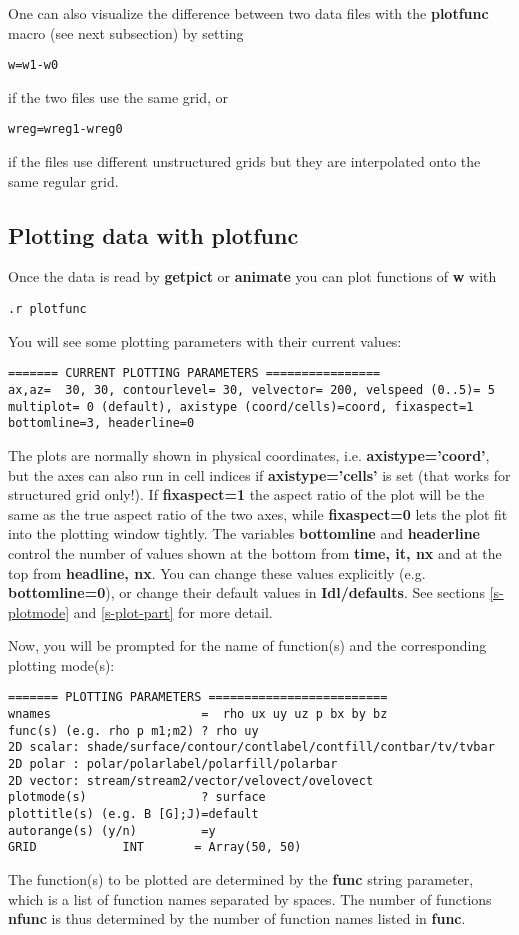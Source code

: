One can also visualize the difference between two data files 
with the {\bf plotfunc} macro (see next subsection) by setting
\begin{verbatim}
w=w1-w0
\end{verbatim}
   if the two files use the same grid, or
\begin{verbatim}
wreg=wreg1-wreg0
\end{verbatim}
if the files use different unstructured grids but they are 
interpolated onto the same regular grid.

\subsection{Plotting data with plotfunc \label{s-plotfunc}}

   Once the data is read by {\bf getpict} or {\bf animate} you can plot 
   functions of {\bf w} with
\begin{verbatim}
.r plotfunc
\end{verbatim}
   You will see some plotting parameters with their current values:
\begin{verbatim}
======= CURRENT PLOTTING PARAMETERS ================
ax,az=  30, 30, contourlevel= 30, velvector= 200, velspeed (0..5)= 5
multiplot= 0 (default), axistype (coord/cells)=coord, fixaspect=1
bottomline=3, headerline=0
\end{verbatim}
   The plots are normally shown in physical coordinates, i.e.
   {\bf axistype='coord'}, but the axes can also run in cell indices 
   if {\bf axistype='cells'} is set (that works for structured grid only!).
   If {\bf fixaspect=1} the aspect ratio of the plot will be the same
   as the true aspect ratio of the two axes, while {\bf fixaspect=0} lets
   the plot fit into the plotting window tightly.
   The variables {\bf bottomline} and {\bf headerline} control the number
   of values shown at the bottom from {\bf time, it, nx} and at the top 
   from {\bf headline, nx}.
   You can change these values explicitly (e.g. {\bf bottomline=0}), or change 
   their default values in {\bf Idl/defaults}. 
   See sections \ref{s-plotmode} and \ref{s-plot-part} for more detail.

   Now, you will be prompted 
   for the name of function(s) and the corresponding plotting mode(s):
\begin{verbatim}
======= PLOTTING PARAMETERS =========================
wnames                     =  rho ux uy uz p bx by bz
func(s) (e.g. rho p m1;m2) ? rho uy
2D scalar: shade/surface/contour/contlabel/contfill/contbar/tv/tvbar
2D polar : polar/polarlabel/polarfill/polarbar
2D vector: stream/stream2/vector/velovect/ovelovect
plotmode(s)                ? surface
plottitle(s) (e.g. B [G];J)=default
autorange(s) (y/n)         =y
GRID            INT       = Array(50, 50)
\end{verbatim}
   The function(s) to be plotted are determined by the {\bf func}
   string parameter, which is a list of function names separated by spaces.
   The number of functions {\bf nfunc} is thus determined by the number of
   function names listed in {\bf func}. 

